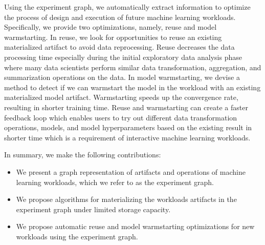 Using the experiment graph, we automatically extract information to optimize the process of design and execution of future machine learning workloads.
Specifically, we provide two optimizations, namely, reuse and model warmstarting.
In reuse, we look for opportunities to reuse an existing materialized artifact to avoid data reprocessing.
Reuse decreases the data processing time especially during the initial exploratory data analysis phase where many data scientists perform similar data transformation, aggregation, and summarization operations on the data.
In model warmstarting, we devise a method to detect if we can warmstart the model in the workload with an existing materialized model artifact.
Warmstarting speeds up the convergence rate, resulting in shorter training time.  %
Reuse and warmstarting can create a faster feedback loop which enables users to try out different data transformation operations, models, and model hyperparameters based on the existing result in shorter time which is a requirement of interactive machine learning workloads.

In summary, we make the following contributions:
\begin{itemize}
\item We present a graph representation of artifacts and operations of machine learning workloads, which we refer to as the experiment graph.
\item We propose algorithms for materializing the workloads artifacts in the experiment graph under limited storage capacity.
\item We propose automatic reuse and model warmstarting optimizations for new workloads using the experiment graph.
\end{itemize}

